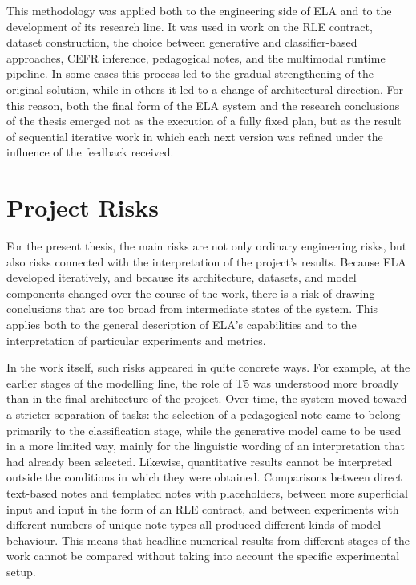 \documentclass[12pt,a4paper,oneside]{report}
\begin{document}
This methodology was applied both to the engineering side of ELA and to the development of its research line. It was used in work on the RLE contract, dataset construction, the choice between generative and classifier-based approaches, CEFR inference, pedagogical notes, and the multimodal runtime pipeline. In some cases this process led to the gradual strengthening of the original solution, while in others it led to a change of architectural direction. For this reason, both the final form of the ELA system and the research conclusions of the thesis emerged not as the execution of a fully fixed plan, but as the result of sequential iterative work in which each next version was refined under the influence of the feedback received.

\section{Project Risks}
For the present thesis, the main risks are not only ordinary engineering risks, but also risks connected with the interpretation of the project's results. Because ELA developed iteratively, and because its architecture, datasets, and model components changed over the course of the work, there is a risk of drawing conclusions that are too broad from intermediate states of the system. This applies both to the general description of ELA's capabilities and to the interpretation of particular experiments and metrics.

In the work itself, such risks appeared in quite concrete ways. For example, at the earlier stages of the modelling line, the role of T5 was understood more broadly than in the final architecture of the project. Over time, the system moved toward a stricter separation of tasks: the selection of a pedagogical note came to belong primarily to the classification stage, while the generative model came to be used in a more limited way, mainly for the linguistic wording of an interpretation that had already been selected. Likewise, quantitative results cannot be interpreted outside the conditions in which they were obtained. Comparisons between direct text-based notes and templated notes with placeholders, between more superficial input and input in the form of an RLE contract, and between experiments with different numbers of unique note types all produced different kinds of model behaviour. This means that headline numerical results from different stages of the work cannot be compared without taking into account the specific experimental setup.
\end{document}
